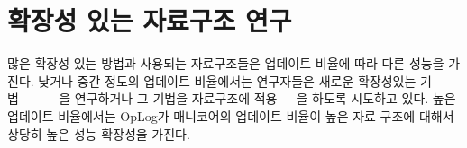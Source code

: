 











\newpage
\section{확장성 있는 자료구조 연구}
\label{sec:datarelated}
많은 확장성 있는 방법과 사용되는 자료구조들은 업데이트 비율에 따라 다른 성능을 가진다.  
낮거나 중간 정도의 업데이트 비율에서는 연구자들은 새로운 확장성있는
기법~\cite{McKenney98}~\cite{Matveev2015RLU}~\cite{Harris2001Lockfree} ~\cite{Fomitchev2004Lockfree}
~\cite{Timnat2012}을 연구하거나 그 기법을 자료구조에 
적용~\cite{Arbel2014ConcurrentRCU}~\cite{Dodds2015SCT}~\cite{AustinTClements2012RCUBalancedTrees}을
하도록 시도하고 있다.
높은 업데이트 비율에서는 OpLog가 매니코어의 업데이트 비율이 높은 자료 구조에 대해서
 상당히 높은 성능 확장성을 가진다. 


